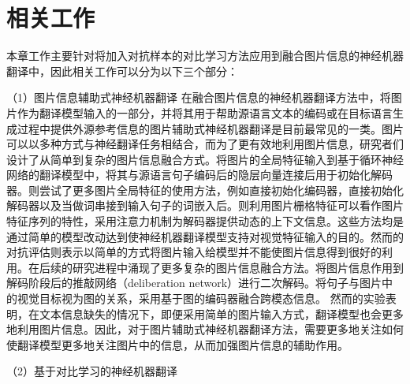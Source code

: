 \section{相关工作}
本章工作主要针对将加入对抗样本的对比学习方法应用到融合图片信息的神经机器翻译中，因此相关工作可以分为以下三个部分：

{\sffamily （1）图片信息辅助式神经机器翻译}
在融合图片信息的神经机器翻译方法中，将图片作为翻译模型输入的一部分，并将其用于帮助源语言文本的编码或在目标语言生成过程中提供外源参考信息的图片辅助式神经机器翻译是目前最常见的一类。图片可以以多种方式与神经翻译任务相结合，而为了更有效地利用图片信息，研究者们设计了从简单到复杂的图片信息融合方式。将图片的全局特征输入到基于循环神经网络的翻译模型中，将其与源语言句子编码后的隐层向量连接后用于初始化解码器。则尝试了更多图片全局特征的使用方法，例如直接初始化编码器，直接初始化解码器以及当做词串接到输入句子的词嵌入后。则利用图片栅格特征可以看作图片特征序列的特性，采用注意力机制为解码器提供动态的上下文信息。这些方法均是通过简单的模型改动达到使神经机器翻译模型支持对视觉特征输入的目的。然而的对抗评估则表示以简单的方式将图片输入给模型并不能使图片信息得到很好的利用。在后续的研究进程中涌现了更多复杂的图片信息融合方法。将图片信息作用到解码阶段后的推敲网络（deliberation network）进行二次解码。将句子与图片中的视觉目标视为图的关系，采用基于图的编码器融合跨模态信息。
然而的实验表明，在文本信息缺失的情况下，即便采用简单的图片输入方式，翻译模型也会更多地利用图片信息。因此，对于图片辅助式神经机器翻译方法，需要更多地关注如何使翻译模型更多地关注图片中的信息，从而加强图片信息的辅助作用。

{\sffamily （2）基于对比学习的神经机器翻译}

